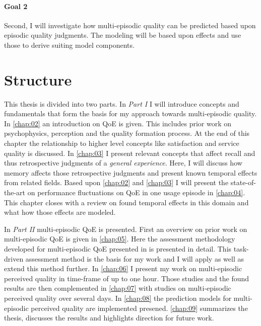 \paragraph*{Goal 2}
Second, I will investigate how multi-episodic quality can be predicted based upon episodic quality judgments.
The modeling will be based upon effects and use those to derive suiting model components.

\section{Structure}
This thesis is divided into two parts.
In \emph{Part I} I will introduce concepts and fundamentals that form the basis for my approach towards multi-episodic quality.
In \autoref{chap:02} an introduction on \ac{QoE} is given.
This includes prior work on psychophysics, perception and the quality formation process.
At the end of this chapter the relationship to higher level concepts like satisfaction and service quality is discussed.
In \autoref{chap:03} I present relevant concepts that affect recall and thus retrospective judgments of a \emph{general experience}.
Here, I will discuss how memory affects those retrospective judgments and present known temporal effects from related fields.
Based upon \autoref{chap:02} and \autoref{chap:03} I will present the state-of-the-art on performance fluctuations on QoE in one usage episode in \autoref{chap:04}.
This chapter closes with a review on found temporal effects in this domain and what how those effects are modeled.

In \emph{Part II} multi-episodic QoE is presented.
First an overview on prior work on multi-episodic QoE is given in \autoref{chap:05}.
Here the assessment methodology developed for multi-episodic QoE presented in \cite{moller_single-call_2011} is presented in detail.
This task-driven assessment method is the basis for my work and I will apply as well as extend this method further.
In \autoref{chap:06} I present my work on multi-episodic perceived quality in time-frame of up to one hour.
Those studies and the found results are then complemented in \autoref{chap:07} with studies on multi-episodic perceived quality over several days.
In \autoref{chap:08} the prediction models for multi-episodic perceived quality are implemented presened.
\autoref{chap:09} summarizes the thesis, discusses the results and highlights direction for future work.